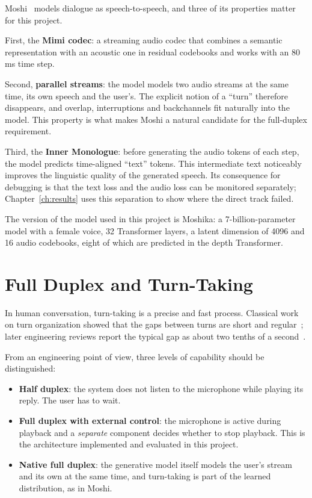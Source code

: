 Moshi~\cite{defossez2024moshi} models dialogue as speech-to-speech, and three of its
properties matter for this project.

First, the \textbf{Mimi codec}: a streaming audio codec that combines a semantic
representation with an acoustic one in residual codebooks and works with an 80 ms
time step.

Second, \textbf{parallel streams}: the model models two audio streams at the same
time, its own speech and the user's. The explicit notion of a ``turn'' therefore
disappears, and overlap, interruptions and backchannels fit naturally into the
model. This property is what makes Moshi a natural candidate for the full-duplex
requirement.

Third, the \textbf{Inner Monologue}: before generating the audio tokens of each
step, the model predicts time-aligned ``text'' tokens. This intermediate text
noticeably improves the linguistic quality of the generated speech. Its consequence
for debugging is that the text loss and the audio loss can be monitored separately;
Chapter~\ref{ch:results} uses this separation to show where the direct track
failed.

The version of the model used in this project is Moshika: a 7-billion-parameter
model with a female voice, 32 Transformer layers, a latent dimension of 4096 and 16
audio codebooks, eight of which are predicted in the depth Transformer.

\section{Full Duplex and Turn-Taking}
\label{sec:duplex}

In human conversation, turn-taking is a precise and fast process. Classical work on
turn organization showed that the gaps between turns are short and
regular~\cite{sacks1974turntaking}; later engineering reviews report the typical gap
as about two tenths of a second~\cite{skantze2021turntaking}.

From an engineering point of view, three levels of capability should be
distinguished:

\begin{itemize}
\item \textbf{Half duplex}: the system does not listen to the microphone while
      playing its reply. The user has to wait.
\item \textbf{Full duplex with external control}: the microphone is active during
      playback and a \emph{separate} component decides whether to stop playback.
      This is the architecture implemented and evaluated in this project.
\item \textbf{Native full duplex}: the generative model itself models the user's
      stream and its own at the same time, and turn-taking is part of the learned
      distribution, as in Moshi.
\end{itemize}

